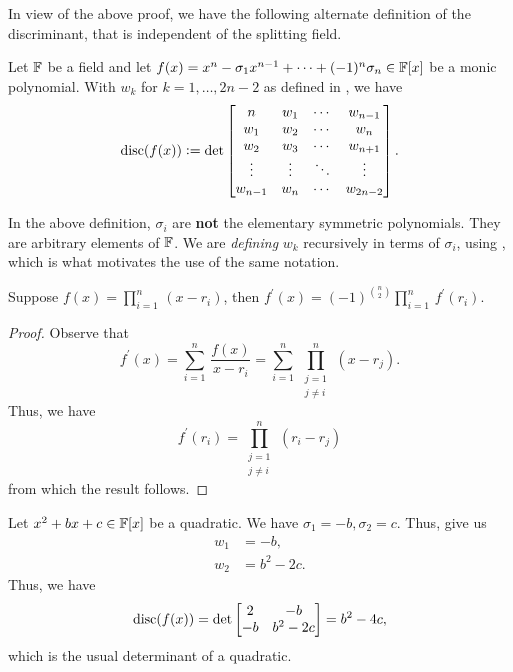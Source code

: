 In view of the above proof, we have the following alternate definition of the discriminant, that is independent of the splitting field. 

\begin{defn}
    Let $\mathbb{F}$ be a field and let $f(x) = x^n - \sigma_1 x^{n-1} + \cdots + (-1)^n \sigma_n \in \mathbb{F}[x]$ be a monic polynomial. With $w_k$ for $k=1,\ldots,2n-2$ as defined in , we have
    \[
        \operatorname{disc}(f(x)) \vcentcolon= \det \begin{bmatrix}
            n & w_1 & \cdots & w_{n-1} \\
            w_1 & w_2 & \cdots & w_n \\
            w_2 & w_3 & \cdots & w_{n+1} \\
            \vdots & \vdots & \ddots & \vdots \\
            w_{n-1} & w_n & \cdots & w_{2n-2}
        \end{bmatrix}.
    \]  
\end{defn}
\begin{rem}
    In the above definition, $\sigma_i$ are \textbf{not} the elementary symmetric polynomials. They are arbitrary elements of $\mathbb{F}$. We are \emph{defining} $w_k$ recursively in terms of $\sigma_i$, using , which is what motivates the use of the same notation.
\end{rem}

\begin{prop} \label{prop:d-in-terms-of-d}
    Suppose $f(x) = \prod_{i=1}^n \, (x-r_i)$, then $f^{\prime}(x) = (-1)^{\binom{n}{2}} \prod_{i=1}^n \, f^{\prime}(r_i)$.
\end{prop}
\begin{proof}
    Observe that
    \[
        f^{\prime}(x) = \sum_{i=1}^n \, \frac{f(x)}{x-r_i} = \sum_{i=1}^n \, \prod_{\substack{j=1 \\ j \neq i}}^n \, (x-r_j).
    \]
    Thus, we have
    \[
        f^{\prime}(r_i) = \prod_{\substack{j=1 \\ j \neq i}}^n \, (r_i - r_j)
    \]
    from which the result follows.
\end{proof}

\begin{ex}
        \item Let $x^2 + bx + c \in \mathbb{F}[x]$ be a quadratic. We have $\sigma_1 = -b, \sigma_2 = c$. Thus,  give us
        \begin{align*}
            w_1 &= -b, \\
            w_2 &= b^2 - 2c.
        \end{align*}
        Thus, we have
        \[
            \operatorname{disc}(f(x)) = \det \begin{bmatrix}
                2 & -b \\
                -b & b^2 - 2c
            \end{bmatrix} = b^2 - 4c,
        \]
        which is the usual determinant of a quadratic.
\end{ex}

